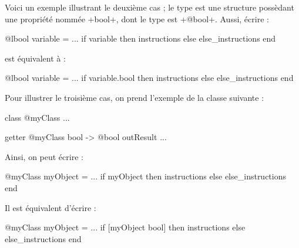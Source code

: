 Voici un exemple illustrant le deuxième cas ; le type  est une structure possèdant une propriété nommée \ggs+bool+, dont le type est \ggs+@bool+. Aussi, écrire :

\begin{galgas}
@lbool variable = ...
if variable then
  instructions
else
  else_instructions
end
\end{galgas}


est équivalent à :
\begin{galgas}
@lbool variable = ...
if variable.bool then
  instructions
else
  else_instructions
end
\end{galgas}


Pour illustrer le troisième cas, on prend l'exemple de la classe suivante :
\begin{galgas}
class @myClass { ... }

getter @myClass bool -> @bool outResult { ... }
\end{galgas}

Ainsi, on peut écrire :
\begin{galgas}
@myClass myObject = ...
if myObject then
  instructions
else
  else_instructions
end
\end{galgas}


Il est équivalent d'écrire :
\begin{galgas}
@myClass myObject = ...
if [myObject bool] then
  instructions
else
  else_instructions
end
\end{galgas}



%
%
%
%


